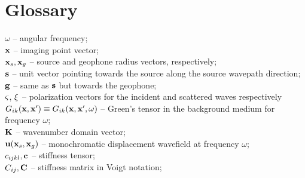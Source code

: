 \section*{Glossary}

$\omega$ -- angular frequency;
\\
$\xv$ -- imaging point vector;
\\
$\xv_s, \xv_g$ -- source and geophone radius vectors, respectively;
\\
$\sv$ -- unit vector pointing towards the source along the source wavepath direction;
\\
$\gv$ -- same as $\sv$ but towards the geophone;
\\
$\sp$, $\gp$ -- polarization vectors for the incident and scattered waves respectively
\\
$G_{ik}(\xv,\xv') \equiv G_{ik}(\xv,\xv',\omega)$ -- Green's tensor in the background medium for frequency $\omega$;
\\
$\Kv$ -- wavenumber domain vector;
\\
$\uv(\xv_s,\xv_g)$ -- monochromatic displacement wavefield at frequency $\omega$;
\\
$c_{ijkl}, \cv$ -- stiffness tensor;
\\
$C_{ij}, \Cv$ -- stiffness matrix in Voigt notation; 
\\
